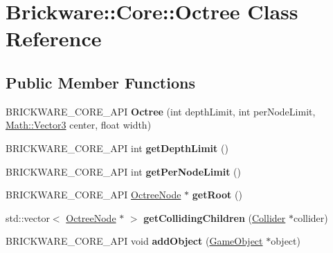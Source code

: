 \hypertarget{classBrickware_1_1Core_1_1Octree}{}\section{Brickware\+:\+:Core\+:\+:Octree Class Reference}
\label{classBrickware_1_1Core_1_1Octree}
\subsection*{Public Member Functions}
\begin{DoxyCompactItemize}
\item 
\hypertarget{classBrickware_1_1Core_1_1Octree_adf7e2412bba55c078d3717f2440db07d}{}B\+R\+I\+C\+K\+W\+A\+R\+E\+\_\+\+C\+O\+R\+E\+\_\+\+A\+P\+I {\bfseries Octree} (int depth\+Limit, int per\+Node\+Limit, \hyperlink{classBrickware_1_1Math_1_1Vector3}{Math\+::\+Vector3} center, float width)\label{classBrickware_1_1Core_1_1Octree_adf7e2412bba55c078d3717f2440db07d}

\item 
\hypertarget{classBrickware_1_1Core_1_1Octree_a571d09115f56ff82da84637a7e97350d}{}B\+R\+I\+C\+K\+W\+A\+R\+E\+\_\+\+C\+O\+R\+E\+\_\+\+A\+P\+I int {\bfseries get\+Depth\+Limit} ()\label{classBrickware_1_1Core_1_1Octree_a571d09115f56ff82da84637a7e97350d}

\item 
\hypertarget{classBrickware_1_1Core_1_1Octree_a91a0d61668c0b3134b6be4e4fe9f9603}{}B\+R\+I\+C\+K\+W\+A\+R\+E\+\_\+\+C\+O\+R\+E\+\_\+\+A\+P\+I int {\bfseries get\+Per\+Node\+Limit} ()\label{classBrickware_1_1Core_1_1Octree_a91a0d61668c0b3134b6be4e4fe9f9603}

\item 
\hypertarget{classBrickware_1_1Core_1_1Octree_a830ac3634acf2f37e13e24f7407af5d4}{}B\+R\+I\+C\+K\+W\+A\+R\+E\+\_\+\+C\+O\+R\+E\+\_\+\+A\+P\+I \hyperlink{classBrickware_1_1Core_1_1OctreeNode}{Octree\+Node} $\ast$ {\bfseries get\+Root} ()\label{classBrickware_1_1Core_1_1Octree_a830ac3634acf2f37e13e24f7407af5d4}

\item 
\hypertarget{classBrickware_1_1Core_1_1Octree_a0fa1ca8ae03aa74dcebeaefffcf3a5d5}{}std\+::vector$<$ \hyperlink{classBrickware_1_1Core_1_1OctreeNode}{Octree\+Node} $\ast$ $>$ {\bfseries get\+Colliding\+Children} (\hyperlink{classBrickware_1_1Core_1_1Collider}{Collider} $\ast$collider)\label{classBrickware_1_1Core_1_1Octree_a0fa1ca8ae03aa74dcebeaefffcf3a5d5}

\item 
\hypertarget{classBrickware_1_1Core_1_1Octree_ad66d0aea2a68d6ee836c04787d37365d}{}B\+R\+I\+C\+K\+W\+A\+R\+E\+\_\+\+C\+O\+R\+E\+\_\+\+A\+P\+I void {\bfseries add\+Object} (\hyperlink{classBrickware_1_1Core_1_1GameObject}{Game\+Object} $\ast$object)\label{classBrickware_1_1Core_1_1Octree_ad66d0aea2a68d6ee836c04787d37365d}

\end{DoxyCompactItemize}
